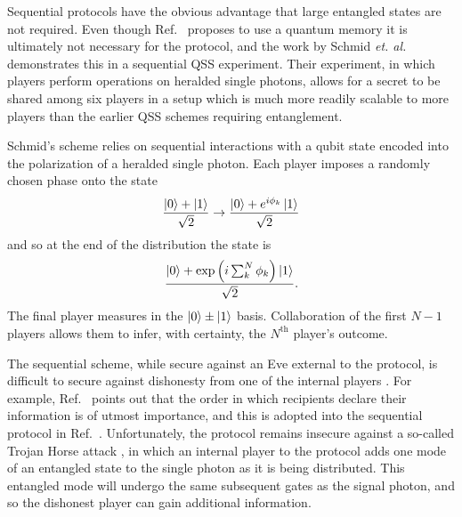 Sequential protocols have the obvious advantage that large entangled states are not required. Even though Ref.~\cite{Zhang2005} proposes to use a quantum memory it is ultimately not necessary for the protocol, and the work by Schmid \emph{et. al.} demonstrates this \cite{Schmid2005} in a sequential QSS experiment. Their experiment, in which players perform operations on heralded single photons, allows for a secret to be shared among six players in a setup which is much more readily scalable to more players than the earlier QSS schemes requiring entanglement.


Schmid's scheme relies on sequential interactions with a qubit state encoded into the polarization of a heralded single photon. Each player imposes a randomly chosen phase onto the state
\begin{equation}
\frac{\ket{0} + \ket{1}}{\sqrt{2}} \rightarrow \frac{\ket{0} + e^{i \phi_k} \ket{1}}{\sqrt{2}}
\end{equation}
and so at the end of the distribution the state is
\begin{equation}
\frac{\ket{0} + \exp\left(i \sum_{k}^N \phi_k\right)\ket{1}}{\sqrt{2}}.
\end{equation}
The final player measures in the $\ket{0} \pm \ket{1}$ basis. Collaboration of the first $N-1$ players allows them to infer, with certainty, the $N^{\text{th}}$ player's outcome.



The sequential scheme, while secure against an Eve external to the protocol, is difficult to secure against dishonesty from one of the internal players \cite{Deng2005, Qin2006, He2007}. For example, Ref.~\cite{He2007} points out that the order in which recipients declare their information is of utmost importance, and this is adopted into the sequential protocol in Ref.~\cite{Schmid2007}. Unfortunately, the protocol remains insecure against a so-called Trojan Horse attack \cite{Deng2005}, in which an internal player to the protocol adds one mode of an entangled state to the single photon as it is being distributed. This entangled mode will undergo the same subsequent gates as the signal photon, and so the dishonest player can gain additional information. 

